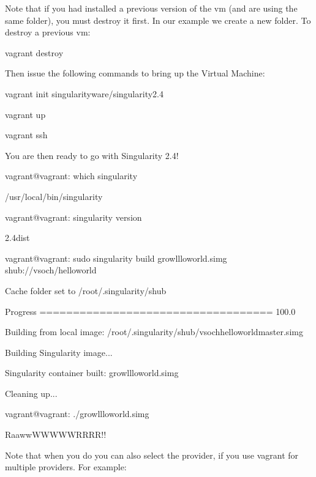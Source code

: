 \documentclass[letterpaper,10pt,english]{sphinxmanual}
\begin{document}
Note that if you had installed a previous version of the vm (and are using the same folder), you must destroy it first. In our example we create a new folder. To destroy a previous vm:

%
\begin{sphinxVerbatim}[commandchars=\\\{\}]
vagrant destroy
\end{sphinxVerbatim}

Then issue the following commands to bring up the Virtual Machine:

%
\begin{sphinxVerbatim}[commandchars=\\\{\}]
vagrant init singularityware/singularity\PYGZhy{}2.4

vagrant up

vagrant ssh
\end{sphinxVerbatim}

You are then ready to go with Singularity 2.4!

%
\begin{sphinxVerbatim}[commandchars=\\\{\}]
vagrant@vagrant:\PYGZti{}\PYGZdl{} which singularity

/usr/local/bin/singularity

vagrant@vagrant:\PYGZti{}\PYGZdl{} singularity \PYGZhy{}\PYGZhy{}version

2.4\PYGZhy{}dist


vagrant@vagrant:\PYGZti{}\PYGZdl{} sudo singularity build growl\PYGZhy{}llo\PYGZhy{}world.simg shub://vsoch/hello\PYGZhy{}world

Cache folder set to /root/.singularity/shub

Progress \textbar{}===================================\textbar{} 100.0\PYGZpc{}

Building from local image: /root/.singularity/shub/vsoch\PYGZhy{}hello\PYGZhy{}world\PYGZhy{}master.simg

Building Singularity image...

Singularity container built: growl\PYGZhy{}llo\PYGZhy{}world.simg

Cleaning up...

vagrant@vagrant:\PYGZti{}\PYGZdl{} ./growl\PYGZhy{}llo\PYGZhy{}world.simg

RaawwWWWWWRRRR!!
\end{sphinxVerbatim}

Note that when you do  you can also select the provider, if you use vagrant for multiple providers. For example:
\end{document}
